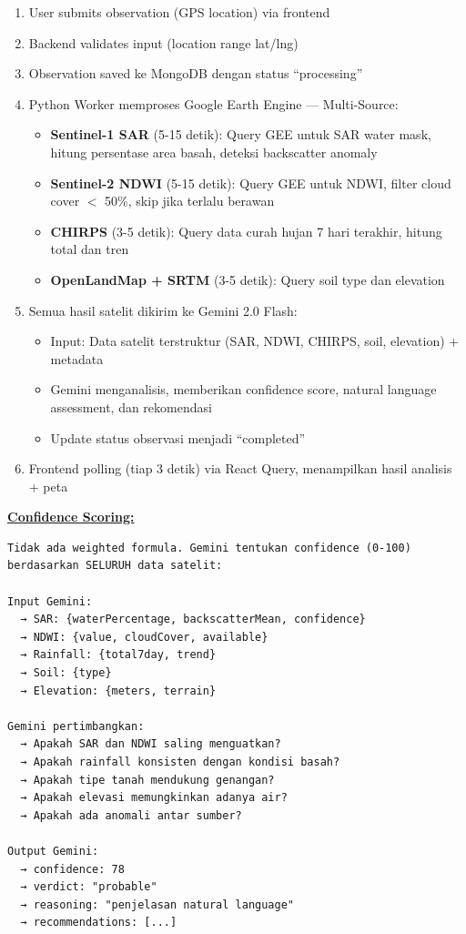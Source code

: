 \documentclass[12pt,a4paper]{article}
\begin{document}
\begin{enumerate}
  \item User submits observation (GPS location) via frontend
  \item Backend validates input (location range lat/lng)
  \item Observation saved ke MongoDB dengan status ``processing''
  \item Python Worker memproses Google Earth Engine — Multi-Source:
    \begin{itemize}
      \item \textbf{Sentinel-1 SAR} (5-15 detik): Query GEE untuk SAR water mask, hitung persentase area basah, deteksi backscatter anomaly
      \item \textbf{Sentinel-2 NDWI} (5-15 detik): Query GEE untuk NDWI, filter cloud cover $<$ 50\%, skip jika terlalu berawan
      \item \textbf{CHIRPS} (3-5 detik): Query data curah hujan 7 hari terakhir, hitung total dan tren
      \item \textbf{OpenLandMap + SRTM} (3-5 detik): Query soil type dan elevation
    \end{itemize}
  \item Semua hasil satelit dikirim ke Gemini 2.0 Flash:
    \begin{itemize}
      \item Input: Data satelit terstruktur (SAR, NDWI, CHIRPS, soil, elevation) + metadata
      \item Gemini menganalisis, memberikan confidence score, natural language assessment, dan rekomendasi
      \item Update status observasi menjadi ``completed''
    \end{itemize}
  \item Frontend polling (tiap 3 detik) via React Query, menampilkan hasil analisis + peta
\end{enumerate}

\textbf{\underline{Confidence Scoring:}}

\begin{verbatim}
Tidak ada weighted formula. Gemini tentukan confidence (0-100)
berdasarkan SELURUH data satelit:

Input Gemini:
  → SAR: {waterPercentage, backscatterMean, confidence}
  → NDWI: {value, cloudCover, available}
  → Rainfall: {total7day, trend}
  → Soil: {type}
  → Elevation: {meters, terrain}

Gemini pertimbangkan:
  → Apakah SAR dan NDWI saling menguatkan?
  → Apakah rainfall konsisten dengan kondisi basah?
  → Apakah tipe tanah mendukung genangan?
  → Apakah elevasi memungkinkan adanya air?
  → Apakah ada anomali antar sumber?

Output Gemini:
  → confidence: 78
  → verdict: "probable"
  → reasoning: "penjelasan natural language"
  → recommendations: [...]
\end{verbatim}
\end{document}
